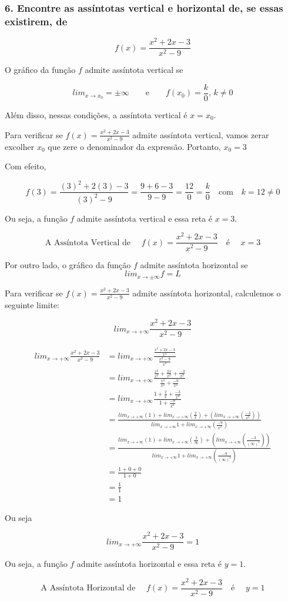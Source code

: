 \documentclass{article}
\begin{document}


\subsubsection*{6. Encontre as assíntotas vertical e horizontal de, se essas existirem, de}

\[
    f(x) = \frac{x^2+2x-3}{x^2-9}
\]

O gráfico da função \(f\) admite assíntota vertical se

\[
    lim_{x\to x_0} = \pm \infty
    \qquad \mbox{e} \qquad
    f(x_0) = \frac{k}{0} \mbox{, } k \neq 0
\]

Além disso, nessas condições, a assíntota vertical é \(x = x_0\).

Para verificar se \(f(x) = \frac{x^2+2x-3}{x^2-9}\) admite assíntota vertical,
vamos zerar excolher \(x_0\) que zere o denominador da expressão. Portanto,
\(x_0 = 3\)

Com efeito,

\[
    f(3) = \frac{(3)^2+2(3)-3}{(3)^2-9}
    = \frac{9+6-3}{9-9}
    = \frac{12}{0} = \frac{k}{0} \quad \mbox{com} \quad k = 12 \neq 0
\]

Ou seja, a função \(f\) admite assíntota vertical e essa reta é \(x = 3\).

\[
    \mbox{A Assíntota Vertical de } \quad
    f(x) = \frac{x^2+2x-3}{x^2-9}
    \quad \mbox{é } \quad
    x = 3
\]

Por outro lado, o gráfico da função \(f\) admite assíntota horizontal se
\[
    lim_{x\to \pm \infty} f = L
\]

Para verificar se \(f(x) = \frac{x^2+2x-3}{x^2-9}\) admite assíntota horizontal,
calculemos o seguinte limite:

\[
    lim_{x\to + \infty} \frac{x^2+2x-3}{x^2-9}
\]

\begin{align*}
    lim_{x\to + \infty} \frac{x^2+2x-3}{x^2-9}
     & = lim_{x\to + \infty} \frac{\frac{x^2+2x-3}{x^2}}{\frac{x^2-9}{x^2}}
    \\ &= lim_{x\to + \infty} \frac{\frac{x^2}{x^2}+\frac{2x}{x^2}+\frac{-3}{x^2}}{\frac{x^2}{x^2}+\frac{-9}{x^2}}
    \\ &= lim_{x\to + \infty} \frac{1+\frac{2}{x}+\frac{-3}{x^2}}{1+\frac{-9}{x^2}}
    \\ &= \frac{lim_{x\to + \infty}(1)+lim_{x\to + \infty}(\frac{2}{x})+(lim_{x\to + \infty}(\frac{-3}{x^2}))}{lim_{x\to + \infty} 1+lim_{x\to + \infty}(\frac{-9}{x^2})}
    \\ &= \frac{lim_{x\to + \infty}(1)+lim_{x\to + \infty}(\frac{2}{\infty})+(lim_{x\to + \infty}(\frac{-3}{(\infty)^2}))}{lim_{x\to + \infty} 1+lim_{x\to + \infty}(\frac{-9}{(\infty)^2})}
    \\ &= \frac{1+0+0}{1+0}
    \\ &= \frac{1}{1}
    \\ &= 1
\end{align*}

Ou seja

\[
    lim_{x\to + \infty} \frac{x^2+2x-3}{x^2-9} = 1
\]

Ou seja, a função \(f\) admite assíntota horizontal e essa reta é \(y = 1\).

\[
    \mbox{A Assíntota Horizontal de } \quad
    f(x) = \frac{x^2+2x-3}{x^2-9}
    \quad \mbox{é } \quad
    y = 1
\]
\end{document}
